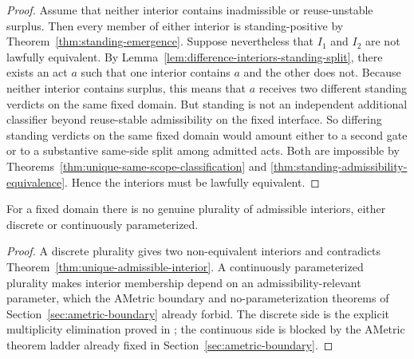 \begin{proof}
Assume that neither interior contains inadmissible or reuse-unstable surplus. Then every member of either interior is standing-positive by Theorem~\ref{thm:standing-emergence}. Suppose nevertheless that $I_1$ and $I_2$ are not lawfully equivalent. By Lemma~\ref{lem:difference-interiors-standing-split}, there exists an act $a$ such that one interior contains $a$ and the other does not. Because neither interior contains surplus, this means that $a$ receives two different standing verdicts on the same fixed domain. But standing is not an independent additional classifier beyond reuse-stable admissibility on the fixed interface. So differing standing verdicts on the same fixed domain would amount either to a second gate or to a substantive same-side split among admitted acts. Both are impossible by Theorems~\ref{thm:unique-same-scope-classification} and \ref{thm:standing-admissibility-equivalence}. Hence the interiors must be lawfully equivalent.\cite{MaleyNecessity}
\end{proof}

\begin{corollary}
For a fixed domain there is no genuine plurality of admissible interiors, either discrete or continuously parameterized.
\end{corollary}

\begin{proof}
A discrete plurality gives two non-equivalent interiors and contradicts Theorem~\ref{thm:unique-admissible-interior}. A continuously parameterized plurality makes interior membership depend on an admissibility-relevant parameter, which the AMetric boundary and no-parameterization theorems of Section~\ref{sec:ametric-boundary} already forbid. The discrete side is the explicit multiplicity elimination proved in \unusdoc{}; the continuous side is blocked by the AMetric theorem ladder already fixed in Section~\ref{sec:ametric-boundary}.\cite{MaleyUnus,MaleyAMetric,MaleyNecessity}
\end{proof}

